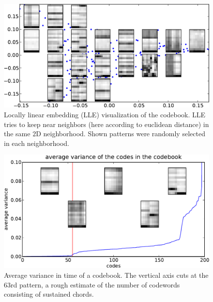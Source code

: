 \documentclass{article}
\begin{document}
\begin{figure}[htb]
\begin{center}
\includegraphics[width=.9\columnwidth]{codes_lle}
\end{center}
\caption{\small{
Locally linear embedding (LLE) visualization of the codebook.
LLE tries to keep near neighbors (here according to euclidean distance)
in the same $2$D neighborhood. Shown patterns were randomly selected
in each neighborhood.
}}
\label{fig:lle}
\end{figure}

\begin{figure}[htb]
\begin{center}
\includegraphics[width=.9\columnwidth]{code_variance}
\end{center}
\caption{\small{Average variance in time of a codebook. The vertical
axis cuts at the $63$rd pattern, a rough estimate of the number of 
codewords consisting of sustained chords.
}}
\label{fig:code_var}
\end{figure}
\end{document}
